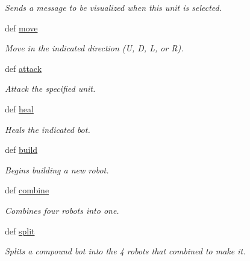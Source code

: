 \begin{DoxyCompactItemize}
\begin{DoxyCompactList}\small\item\em Sends a message to be visualized when this unit is selected. \item\end{DoxyCompactList}\item 
def \hyperlink{classGameObject_1_1Bot_a1a55ec801c2aff9eee777579972ad6ef}{move}
\begin{DoxyCompactList}\small\item\em Move in the indicated direction (U, D, L, or R). \item\end{DoxyCompactList}\item 
def \hyperlink{classGameObject_1_1Bot_a20ce42e67cc1586a7086b708c56b6609}{attack}
\begin{DoxyCompactList}\small\item\em Attack the specified unit. \item\end{DoxyCompactList}\item 
def \hyperlink{classGameObject_1_1Bot_ab0d8899c1214ba9b4311300dc0e7cb1b}{heal}
\begin{DoxyCompactList}\small\item\em Heals the indicated bot. \item\end{DoxyCompactList}\item 
def \hyperlink{classGameObject_1_1Bot_acb307f9ba536de899c113047d2599d05}{build}
\begin{DoxyCompactList}\small\item\em Begins building a new robot. \item\end{DoxyCompactList}\item 
def \hyperlink{classGameObject_1_1Bot_a86ef5a544c38e3bcbfc961ab5d4ff58f}{combine}
\begin{DoxyCompactList}\small\item\em Combines four robots into one. \item\end{DoxyCompactList}\item 
def \hyperlink{classGameObject_1_1Bot_a580aa8beb8bf56bbd471db9474865b11}{split}
\begin{DoxyCompactList}\small\item\em Splits a compound bot into the 4 robots that combined to make it. \item\end{DoxyCompactList}\item 

\end{DoxyCompactItemize}
